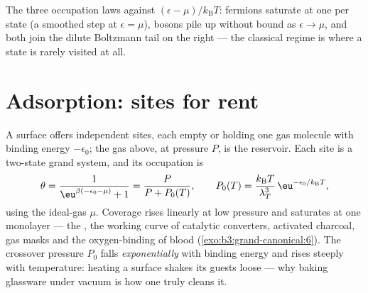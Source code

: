\begin{omfigure}

{\small The three occupation laws against $(\epsilon -
\mu)/k_{\text{B}}T$: fermions saturate at one per state (a
smoothed step at $\epsilon = \mu$), bosons pile up without bound as
$\epsilon \to \mu$, and both join the dilute Boltzmann tail on the
right --- the classical regime is where a state is rarely visited
at all.}
\end{omfigure}

\section{Adsorption: sites for rent}

\begin{proposition}\label{prop:b3:grand-canonical:langmuir}
A surface offers independent sites, each empty or holding one gas
molecule with binding energy $-\epsilon_0$; the gas above, at
pressure $P$, is the reservoir. Each site is a two-state grand
system, and its occupation is
\[
\theta = \frac{1}{\eu^{\beta(-\epsilon_0 - \mu)} + 1}
 = \frac{P}{P + P_0(T)} , \qquad
P_0(T) = \frac{k_{\text{B}}T}{\lambda_T^3}\,
\eu^{-\epsilon_0/k_{\text{B}}T} ,
\]
using the ideal-gas $\mu$. Coverage rises linearly at low
pressure and saturates at one monolayer --- the \emph{}, the working curve of catalytic converters, activated
charcoal, gas masks and the oxygen-binding of blood
(\cref{exo:b3:grand-canonical:6}). The crossover pressure $P_0$
falls \emph{exponentially} with binding energy and rises steeply
with temperature: heating a surface shakes its guests loose ---
why baking glassware under vacuum is how one truly cleans it.
\end{proposition}

